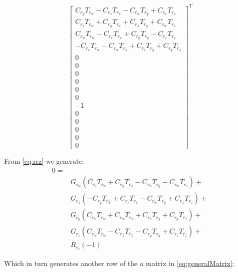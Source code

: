 \documentclass[12pt]{article}
\begin{document}
	 \begin{equation}
	     \begin{bmatrix}
	     C_{r_y} T_{r_w}-C_{r_z} T_{r_x}-C_{r_w} T_{r_y}+C_{r_x} T_{r_z}\\
	     C_{r_z} T_{r_w}+C_{r_y} T_{r_x}+C_{r_x} T_{r_y}+C_{r_w} T_{r_z}\\
	     C_{r_w} T_{r_w}-C_{r_x} T_{r_x}+C_{r_y} T_{r_y}-C_{r_z} T_{r_z}\\
	     -C_{r_x} T_{r_w}-C_{r_w} T_{r_x}+C_{r_z} T_{r_y}+C_{r_y} T_{r_z}\\
	     0 \\ 0 \\ 0 \\ 0 \\ 0 \\ 0 \\ -1 \\ 0 \\ 0 \\ 0 \\ 0 \\ 0
	      \end{bmatrix}^T
	  \end{equation}
	  
	  From \autoref{eq:rrz} we generate:
	  \begin{equation}
	      \begin{split}
	  0= \\&
	  G_{r_w} (C_{r_z} T_{r_w}+C_{r_y} T_{r_x}-C_{r_x} T_{r_y}-C_{r_w} T_{r_z})+\\&
	  G_{r_x} (-C_{r_y} T_{r_w}+C_{r_z} T_{r_x}-C_{r_w} T_{r_y}+C_{r_x} T_{r_z})+\\&
	  G_{r_y} (C_{r_x} T_{r_w}+C_{r_w} T_{r_x}+C_{r_z} T_{r_y}+C_{r_y} T_{r_z})+\\&
	  G_{r_z} (C_{r_w} T_{r_w}-C_{r_x} T_{r_x}-C_{r_y} T_{r_y}+C_{r_z} T_{r_z})+\\&
	   R_{r_z}(-1)
	   \end{split}
	   \end{equation}
	  
	   Which in turn generates another row of the $a$ matrix in \autoref{eq:generalMatrix}:
	  
\end{document}
